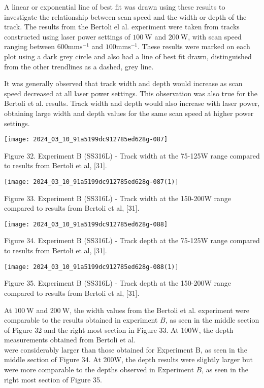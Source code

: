 \documentclass[10pt]{article}
\begin{document}
A linear or exponential line of best fit was drawn using these results to investigate the relationship between scan speed and the width or depth of the track. The results from the Bertoli el al. experiment were taken from tracks constructed using laser power settings of $100 \mathrm{~W}$ and $200 \mathrm{~W}$, with scan speed ranging between $600 \mathrm{mms}^{-1}$ and $100 \mathrm{mms}^{-1}$. These results were marked on each plot using a dark grey circle and also had a line of best fit drawn, distinguished from the other trendlines as a dashed, grey line.

It was generally observed that track width and depth would increase as scan speed decreased at all laser power settings. This observation was also true for the Bertoli et al. results. Track width and depth would also increase with laser power, obtaining large width and depth values for the same scan speed at higher power settings.

\begin{center}
\texttt{[image: 2024\_03\_10\_91a5199dc912785ed628g-087]}
\end{center}

Figure 32. Experiment B (SS316L) - Track width at the 75-125W range compared to results from Bertoli et al, [31].

\begin{center}
\texttt{[image: 2024\_03\_10\_91a5199dc912785ed628g-087(1)]}
\end{center}

Figure 33. Experiment B (SS316L) - Track width at the 150-200W range compared to results from Bertoli et al, [31].

\begin{center}
\texttt{[image: 2024\_03\_10\_91a5199dc912785ed628g-088]}
\end{center}

Figure 34. Experiment B (SS316L) - Track depth at the 75-125W range compared to results from Bertoli et al, [31].

\begin{center}
\texttt{[image: 2024\_03\_10\_91a5199dc912785ed628g-088(1)]}
\end{center}

Figure 35. Experiment B (SS316L) - Track depth at the 150-200W range compared to results from Bertoli et al, [31].

At $100 \mathrm{~W}$ and $200 \mathrm{~W}$, the width values from the Bertoli et al. experiment were comparable to the results obtained in experiment $B$, as seen in the middle section of Figure 32 and the right most section in Figure 33. At 100W, the depth measurements obtained from Bertoli et al.\\
were considerably larger than those obtained for Experiment B, as seen in the middle section of Figure 34. At 200W, the depth results were slightly larger but were more comparable to the depths observed in Experiment $B$, as seen in the right most section of Figure 35.
\end{document}

